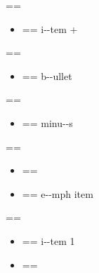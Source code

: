 \documentclass{book}
\makeatletter
\newenvironment{Texinfopreformatted}{%
  \par\GNUTobeylines\obeyspaces\frenchspacing\parskip=\z@\parindent=\z@}{}
{\catcode`\^^M=13 \gdef\GNUTobeylines{\catcode`\^^M=13 \def^^M{\null\par}}}
\newenvironment{Texinfoindented}{\begin{list}{}{}\item\relax}{\end{list}}
\renewcommand{\_}{\Texinfounderscore\discretionary{}{}{}}
\makeatother
\begin{document}
\begin{Texinfoindented}
\begin{Texinfopreformatted}
\ttfamily 
\end{Texinfopreformatted}
\begin{itemize}[label=+]
\item \begin{Texinfopreformatted}%
\ttfamily i{-}{-}tem +
\end{Texinfopreformatted}
\end{itemize}
\begin{Texinfopreformatted}%
\ttfamily 
\end{Texinfopreformatted}
\begin{itemize}[label=\textbullet{}]
\item \begin{Texinfopreformatted}%
\ttfamily b{-}{-}ullet
\end{Texinfopreformatted}
\end{itemize}
\begin{Texinfopreformatted}%
\ttfamily 
\end{Texinfopreformatted}
\begin{itemize}[label=-]
\item \begin{Texinfopreformatted}%
\ttfamily minu{-}{-}s
\end{Texinfopreformatted}
\end{itemize}
\begin{Texinfopreformatted}%
\ttfamily 
\end{Texinfopreformatted}
\begin{itemize}[label=\emph{after emph}]
\item \begin{Texinfopreformatted}%
\ttfamily \end{Texinfopreformatted}
\item \begin{Texinfopreformatted}%
\ttfamily e{-}{-}mph item
\end{Texinfopreformatted}
\end{itemize}
\begin{Texinfopreformatted}%
\ttfamily 
\end{Texinfopreformatted}
\begin{itemize}[label=\textbullet{} a--n itemize line]
\item \begin{Texinfopreformatted}%
\ttfamily {}%
i{-}{-}tem 1
\end{Texinfopreformatted}
\item \begin{Texinfopreformatted}%

\end{Texinfopreformatted}
\end{itemize}
\end{Texinfoindented}
\end{document}
